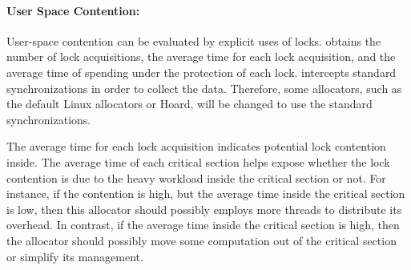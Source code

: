 \paragraph{User Space Contention:} User-space contention can be evaluated by explicit uses of locks. \MP{} obtains the number of lock acquisitions, the average time for each lock acquisition, and the average time of spending under the protection of each lock. \MP{} intercepts standard synchronizations in order to collect the data. Therefore, some allocators, such as the default Linux allocators or Hoard, will be changed to use the standard synchronizations.  

The average time for each lock acquisition indicates potential lock contention inside. The average time of each critical section helps expose whether the lock contention is due to the heavy workload inside the critical section or not. For instance, if the contention is high, but the average time inside the critical section is low, then this allocator should possibly employs more  threads to distribute its overhead. In contrast, if the average time inside the critical section is high, then the allocator should possibly move some computation out of the critical section or simplify its management. 



